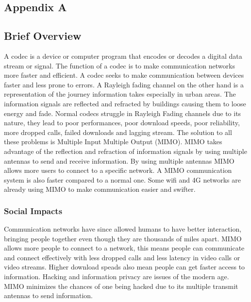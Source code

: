 \documentclass[11pt]{report}
\begin{document}


\newpage
\begin{appendices}
	
	\section*{Appendix A}
	
	\subsection*{Brief Overview}
	A codec is a device or computer program that encodes or decodes a digital data stream or signal. The function of a codec is to make communication networks more faster and efficient. A codec seeks to make communication between devices faster and less prone to errors. A Rayleigh fading channel on the other hand is a representation of the journey information takes especially in urban areas. The information signals are reflected and refracted by buildings causing them to loose energy and fade. Normal codecs struggle in Rayleigh Fading channels due to its nature, they lead to poor performances, poor download speeds,  poor reliability, more dropped calls, failed downloads and lagging stream. The solution to all these problems is Multiple Input Multiple Output (MIMO). MIMO takes advantage of the reflection and refraction of information signals by using multiple antennas to send and receive information. By using multiple antennas MIMO allows more users to connect to a specific network. A MIMO communication system is also faster compared to a normal one. Some wifi and 4G networks are already using MIMO to make communication easier and swifter.
	
	
	\subsubsection*{Social Impacts}
	Communication networks have since allowed humans to have better interaction, bringing people together even though they are thousands of miles apart. MIMO allows more people to connect to a network, this means people can communicate and connect effectively with less dropped calls and less latency in video calls or video streams. Higher download speads also mean people can get faster access to information. Hacking and information privacy are issues of the modern age. MIMO minimizes the chances of one being hacked due to its multiple transmit antennas to send information.
	

\end{appendices}
\end{document}
